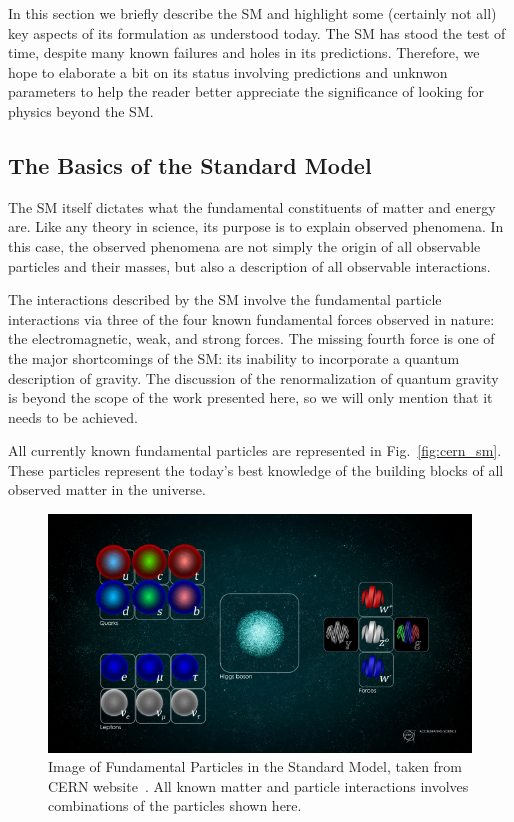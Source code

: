 In this section we briefly describe the SM and highlight some (certainly not all) key aspects of its formulation as understood today.
The SM has stood the test of time, despite many known failures and holes in its predictions.
Therefore, we hope to elaborate a bit on its status involving predictions and unknwon parameters to help the reader better appreciate the significance of looking for physics beyond the SM.

\subsection{The Basics of the Standard Model}

The SM itself dictates what the fundamental constituents of matter and energy are.
Like any theory in science, its purpose is to explain observed phenomena.
In this case, the observed phenomena are not simply the origin of all observable particles and their masses, but also a description of all observable interactions.

The interactions described by the SM involve the fundamental particle interactions via three of the four known fundamental forces observed in nature: the electromagnetic, weak, and strong forces.
The missing fourth force is one of the major shortcomings of the SM: its inability to incorporate a quantum description of gravity.
The discussion of the renormalization of quantum gravity is beyond the scope of the work presented here, so we will only mention that it needs to be achieved.

All currently known fundamental particles are represented in Fig.~\ref{fig:cern_sm}.
These particles represent the today's best knowledge of the building blocks of all observed matter in the universe.

\begin{figure}[]
\centering
\includegraphics[width=\textwidth]{images/STDM_higgs_and_field_D.png}
\caption{Image of Fundamental Particles in the Standard Model, taken from CERN website~\citep{dominguez_2015}.
  All known matter and particle interactions involves combinations of the particles shown here.}
\end{figure}
~\label{fig:cern_sm}

